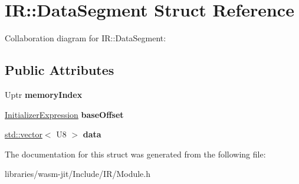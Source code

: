 \hypertarget{struct_i_r_1_1_data_segment}{}\section{IR\+:\+:Data\+Segment Struct Reference}
\label{struct_i_r_1_1_data_segment}


Collaboration diagram for IR\+:\+:Data\+Segment\+:
\subsection*{Public Attributes}
\begin{DoxyCompactItemize}
\item 
\mbox{\label{struct_i_r_1_1_data_segment_aa39d9ad64b6cf326bc37f1dd9e174166}} 
Uptr {\bfseries memory\+Index}
\item 
\mbox{\label{struct_i_r_1_1_data_segment_a4426062ee993d970dfa7b9e33dd7da6b}} 
\mbox{\hyperlink{struct_i_r_1_1_initializer_expression}{Initializer\+Expression}} {\bfseries base\+Offset}
\item 
\mbox{\label{struct_i_r_1_1_data_segment_a32f58a06f3c2dfff7094c92f63ed1d23}} 
\mbox{\hyperlink{classstd_1_1vector}{std\+::vector}}$<$ U8 $>$ {\bfseries data}
\end{DoxyCompactItemize}


The documentation for this struct was generated from the following file\+:\begin{DoxyCompactItemize}
\item 
libraries/wasm-\/jit/\+Include/\+I\+R/Module.\+h\end{DoxyCompactItemize}
